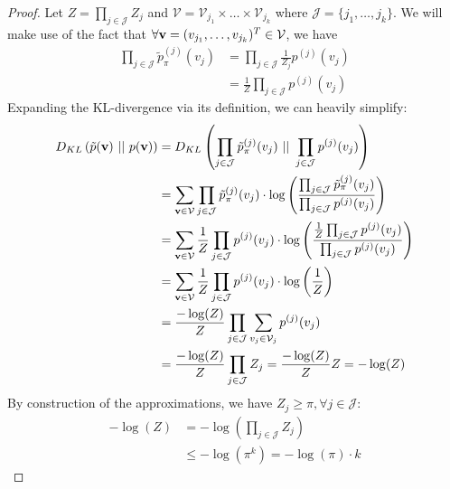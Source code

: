 \begin{proof}
Let $Z = \prod_{j \in \mathcal{J}} Z_j$ and $\mathcal{V} = \mathcal{V}_{j_1} \times \dots \times \mathcal{V}_{j_k}$ where $\mathcal{J} = \{ j_1,\dots,j_k \}$. We will make use of the fact that $\forall \mathbf{v} = (v_{j_1}, \dots, v_{j_k})^T \in \mathcal{V}$, we have
\begin{align}
\prod_{j \in \mathcal{J}} \tilde{p}^{(j)}_\pi(v_j) &= \prod_{j \in \mathcal{J}} \frac{1}{Z_j} p^{(j)}(v_j) \\
&= \frac{1}{Z} \prod_{j \in \mathcal{J}} p^{(j)}(v_j)
\end{align}
Expanding the KL-divergence via its definition, we can heavily simplify:
\begin{align}
    D_{KL}\left( \tilde{p}(\vv) \ || \ p(\vv) \right) &= D_{KL}\left( \prod_{j \in \mathcal{J}} \tilde{p}^{(j)}_\pi(v_j) \ || \ \prod_{j \in \mathcal{J}} p^{(j)}(v_j) \right) \\
    &= \sum_{\vv \in \mathcal{V}} \prod_{j \in \mathcal{J}} \tilde{p}^{(j)}_\pi(v_j) \cdot \log \left( \frac{\prod_{j \in \mathcal{J}} \tilde{p}^{(j)}_\pi(v_j)}{\prod_{j \in \mathcal{J}} p^{(j)}(v_j)} \right) \\
    &= \sum_{\vv \in \mathcal{V}} \frac{1}{Z} \prod_{j \in \mathcal{J}} p^{(j)}(v_j) \cdot \log \left( \frac{\frac{1}{Z} \prod_{j \in \mathcal{J}} p^{(j)}(v_j)}{\prod_{j \in \mathcal{J}} p^{(j)}(v_j)} \right) \\
    &= \sum_{\vv \in \mathcal{V}} \frac{1}{Z} \prod_{j \in \mathcal{J}} p^{(j)}(v_j) \cdot \log \left( \frac{1}{Z} \right) \\
    &= \frac{-\log(Z)}{Z} \prod_{j \in \mathcal{J}} \sum_{v_j \in \mathcal{V}_j} p^{(j)}(v_j) \\
    &= \frac{-\log(Z)}{Z} \prod_{j \in \mathcal{J}} Z_j = \frac{-\log(Z)}{Z} Z = -\log(Z)
\end{align}
By construction of the approximations, we have $Z_j \geq \pi, \forall j \in \mathcal{J}$:
\begin{align}
-\log(Z) &= -\log \left( \prod_{j \in \mathcal{J}} Z_j \right) \\
         &\leq -\log \left( \pi^k \right) = -\log \left( \pi \right) \cdot k
\end{align}
\end{proof}

